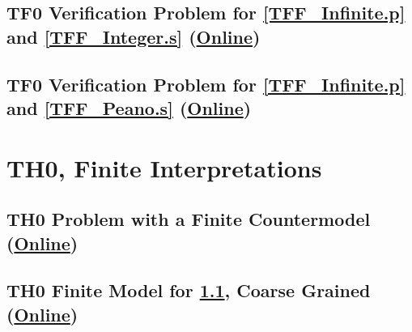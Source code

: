 \documentclass{easychair}
\begin{document}
\newpage
\subsection{TF0 Verification Problem for \ref{TFF_Infinite.p} and \ref{TFF_Integer.s}
(\href{https://raw.githubusercontent.com/GeoffsPapers/InterpretationFormat/master/Examples/TFF_Integer.s.p}{Online})}
\label{TFF_Integer.s.p}
\begin{small}

\end{small}

\newpage
\subsection{TF0 Verification Problem for \ref{TFF_Infinite.p} and \ref{TFF_Peano.s}
(\href{https://raw.githubusercontent.com/GeoffsPapers/InterpretationFormat/master/Examples/TFF_Peano.s.p}{Online})}
\label{TFF_Peano.s.p}
\begin{small}

\end{small}

\newpage
\section{TH0, Finite Interpretations}
\label{TH0Finite}

\subsection{TH0 Problem with a Finite Countermodel
(\href{https://raw.githubusercontent.com/GeoffsPapers/InterpretationFormat/master/Examples/THF_Finite.p}{Online})}
\label{THF_Finite.p}
\begin{small}

\end{small}

\newpage
\subsection{TH0 Finite Model for \ref{THF_Finite.p}, Coarse Grained
(\href{https://raw.githubusercontent.com/GeoffsPapers/InterpretationFormat/master/Examples/THF_Finite.s}{Online})}
\label{THF_Finite.s}
\begin{small}

\end{small}
\end{document}
